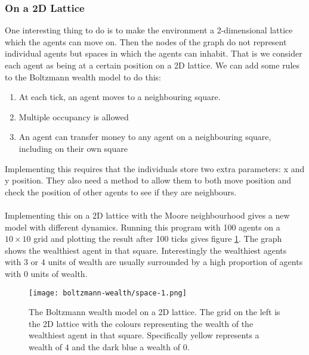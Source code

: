 \subsubsection{On a 2D Lattice}
One interesting thing to do is to make the environment a 2-dimensional lattice which the agents can move on. Then the nodes of the graph do not represent individual agents but spaces in which the agents can inhabit. That is we consider each agent as being at a certain position on a 2D lattice. We can add some rules to the Boltzmann wealth model to do this:
\begin{enumerate}[
	]
	\setcounter{enumi}{\value{rule}}
	\item At each tick, an agent moves to a neighbouring square.
	\item Multiple occupancy is allowed
	\item An agent can transfer money to any agent on a neighbouring square, including on their own square
\end{enumerate}
Implementing this requires that the individuals store two extra parameters: x and y position. They also need a method to allow them to both move position and check the position of other agents to see if they are neighbours.\\
\\
Implementing this on a 2D lattice with the Moore neighbourhood gives a new model with different dynamics. Running this program with 100 agents on a $10\times10$ grid and plotting the result after 100 ticks gives figure \ref{fig:space-1}. The graph shows the wealthiest agent in that square. Interestingly the wealthiest agents with $3$ or $4$ units of wealth are usually surrounded by a high proportion of agents with $0$ units of wealth.
\begin{figure}[!h]
	\centering
	\texttt{[image: boltzmann-wealth/space-1.png]}
	\caption{The Boltzmann wealth model on a 2D lattice. The grid on the left is the 2D lattice with the colours representing the wealth of the wealthiest agent in that square. Specifically yellow represents a wealth of $4$ and the dark blue a wealth of $0$.}
	\label{fig:space-1}
\end{figure}
